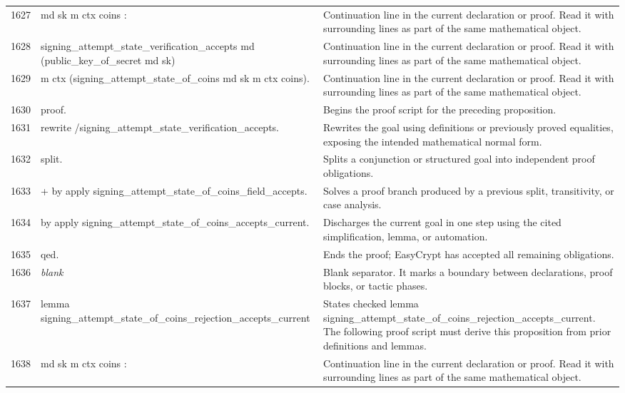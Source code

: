 \documentclass[10pt]{article}
\begin{document}
\begin{longtable}{r L{0.53\textwidth} L{0.37\textwidth}}
1627 & {\ttfamily\scriptsize    md sk m ctx coins :} & Continuation line in the current declaration or proof.  Read it with surrounding lines as part of the same mathematical object. \\
1628 & {\ttfamily\scriptsize   signing\_attempt\_state\_verification\_accepts md (public\_key\_of\_secret md sk)} & Continuation line in the current declaration or proof.  Read it with surrounding lines as part of the same mathematical object. \\
1629 & {\ttfamily\scriptsize     m ctx (signing\_attempt\_state\_of\_coins md sk m ctx coins).} & Continuation line in the current declaration or proof.  Read it with surrounding lines as part of the same mathematical object. \\
1630 & {\ttfamily\scriptsize proof.} & Begins the proof script for the preceding proposition. \\
1631 & {\ttfamily\scriptsize rewrite /signing\_attempt\_state\_verification\_accepts.} & Rewrites the goal using definitions or previously proved equalities, exposing the intended mathematical normal form. \\
1632 & {\ttfamily\scriptsize split.} & Splits a conjunction or structured goal into independent proof obligations. \\
1633 & {\ttfamily\scriptsize + by apply signing\_attempt\_state\_of\_coins\_field\_accepts.} & Solves a proof branch produced by a previous split, transitivity, or case analysis. \\
1634 & {\ttfamily\scriptsize by apply signing\_attempt\_state\_of\_coins\_accepts\_current.} & Discharges the current goal in one step using the cited simplification, lemma, or automation. \\
1635 & {\ttfamily\scriptsize qed.} & Ends the proof; EasyCrypt has accepted all remaining obligations. \\
1636 & {\ttfamily\scriptsize \emph{blank}} & Blank separator.  It marks a boundary between declarations, proof blocks, or tactic phases. \\
1637 & {\ttfamily\scriptsize lemma signing\_attempt\_state\_of\_coins\_rejection\_accepts\_current} & States checked lemma signing\_attempt\_state\_of\_coins\_rejection\_accepts\_current.  The following proof script must derive this proposition from prior definitions and lemmas. \\
1638 & {\ttfamily\scriptsize    md sk m ctx coins :} & Continuation line in the current declaration or proof.  Read it with surrounding lines as part of the same mathematical object. \\

\end{longtable}
\end{document}
